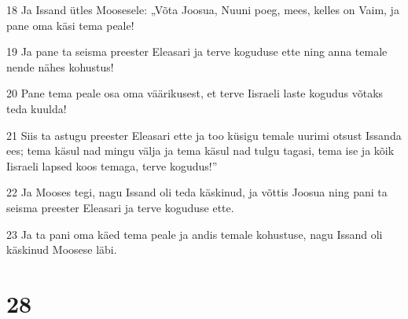 \par 18 Ja Issand ütles Moosesele: „Võta Joosua, Nuuni poeg, mees, kelles on Vaim, ja pane oma käsi tema peale!
\par 19 Ja pane ta seisma preester Eleasari ja terve koguduse ette ning anna temale nende nähes kohustus!
\par 20 Pane tema peale osa oma väärikusest, et terve Iisraeli laste kogudus võtaks teda kuulda!
\par 21 Siis ta astugu preester Eleasari ette ja too küsigu temale uurimi otsust Issanda ees; tema käsul nad mingu välja ja tema käsul nad tulgu tagasi, tema ise ja kõik Iisraeli lapsed koos temaga, terve kogudus!”
\par 22 Ja Mooses tegi, nagu Issand oli teda käskinud, ja võttis Joosua ning pani ta seisma preester Eleasari ja terve koguduse ette.
\par 23 Ja ta pani oma käed tema peale ja andis temale kohustuse, nagu Issand oli käskinud Moosese läbi.

\chapter{28}


